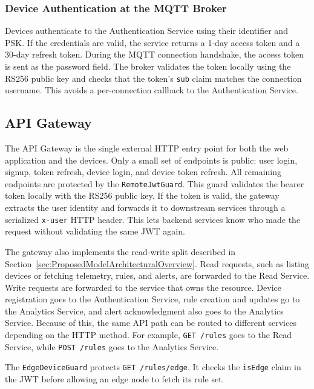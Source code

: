 \subsubsection{Device Authentication at the \gls{MQTT} Broker}
\label{subsubsec:device-auth-mqtt}

Devices authenticate to the Authentication Service using their identifier and \gls{PSK}. If the credentials are valid, the service returns a 1-day access token and a 30-day refresh token. During the \gls{MQTT} connection handshake, the access token is sent as the password field. The broker validates the token locally using the RS256 public key and checks that the token's \texttt{sub} claim matches the connection username. This avoids a per-connection callback to the Authentication Service.

\subsection{API Gateway}
\label{subsec:APIGatewayImpl}

The API Gateway is the single external \gls{HTTP} entry point for both the web application and the devices. Only a small set of endpoints is public: user login, signup, token refresh, device login, and device token refresh. All remaining endpoints are protected by the \texttt{RemoteJwtGuard}. This guard validates the bearer token locally with the RS256 public key. If the token is valid, the gateway extracts the user identity and forwards it to downstream services through a serialized \texttt{x-user} \gls{HTTP} header. This lets backend services know who made the request without validating the same \gls{JWT} again.

The gateway also implements the read-write split described in Section~\ref{sec:ProposedModelArchitecturalOverview}. Read requests, such as listing devices or fetching telemetry, rules, and alerts, are forwarded to the Read Service. Write requests are forwarded to the service that owns the resource. Device registration goes to the Authentication Service, rule creation and updates go to the Analytics Service, and alert acknowledgment also goes to the Analytics Service. Because of this, the same \gls{API} path can be routed to different services depending on the \gls{HTTP} method. For example, \texttt{GET /rules} goes to the Read Service, while \texttt{POST /rules} goes to the Analytics Service.

The \texttt{EdgeDeviceGuard} protects \texttt{GET /rules/edge}. It checks the \texttt{isEdge} claim in the \gls{JWT} before allowing an edge node to fetch its rule set.


